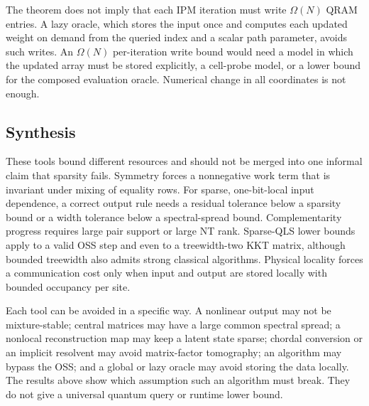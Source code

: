The theorem does not imply that each IPM iteration must write
$\Omega(N)$ QRAM entries.  A lazy oracle, which stores the input once and
computes each updated weight on demand from the queried index and a scalar
path parameter, avoids such writes.  An $\Omega(N)$ per-iteration write
bound would need a model in which the updated array must be stored
explicitly, a cell-probe model, or a lower bound for the composed evaluation
oracle.  Numerical change in all coordinates is not enough.

\subsection{Synthesis}
\label{sec:structural-synthesis}

These tools bound different resources and should not be merged into one
informal claim that sparsity fails.  Symmetry forces a nonnegative work term
that is invariant under mixing of equality rows.  For sparse, one-bit-local
input dependence, a correct output rule needs a residual tolerance below a
sparsity bound or a width tolerance below a spectral-spread bound.  Complementarity progress
requires large pair support or large NT rank.  Sparse-QLS lower bounds apply
to a valid OSS step and even to a treewidth-two KKT matrix, although bounded
treewidth also admits strong classical algorithms.  Physical locality forces
a communication cost only when input and output are stored locally with
bounded occupancy per site.

Each tool can be avoided in a specific way.  A nonlinear output may not
be mixture-stable; central matrices may have a large common spectral
spread; a nonlocal reconstruction map may keep a latent state sparse;
chordal conversion or an implicit resolvent may avoid matrix-factor
tomography; an algorithm may bypass the OSS; and a global or lazy oracle may
avoid storing the data locally.  The results above show which assumption
such an algorithm must break.  They do not give a universal quantum query or
runtime lower bound.
